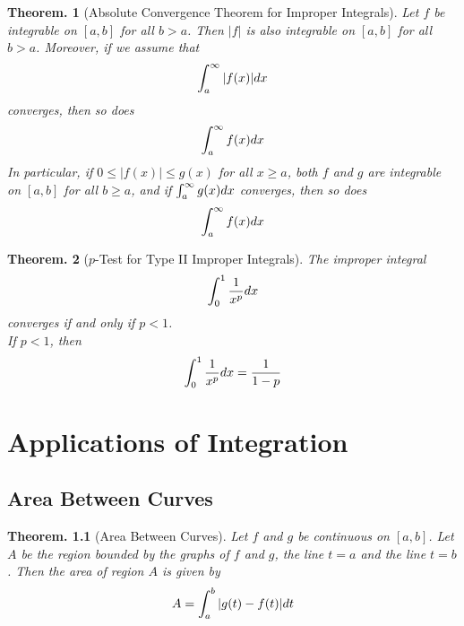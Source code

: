 \documentclass[11pt, a4paper]{memoir}
\theoremstyle{change}
\newtheorem{theorem}{Theorem.}[section]
\theoremstyle{plain}
\theoremstyle{nonumberplain}
\numberwithin{equation}{section}
\begin{document}
\begin{theorem}[Absolute Convergence Theorem for Improper Integrals]
    Let $f$ be integrable on $[a,b]$ for all $b > a$. Then $|f|$ is also integrable on $[a,b]$ for all $b > a$. Moreover, if we assume that $$\int^\infty_a |f(x)|\space dx$$ converges, then so does $$\int^\infty_a f(x) \space dx$$ In particular, if $0 \le |f(x)| \le g(x)$ for all $x \ge a$, both $f$ and $g$ are integrable on $[a,b]$ for all $b \ge a$, and if  $\int^\infty_a g(x) \space dx$ converges, then so does $$\int^\infty_a f(x) \space dx$$
\end{theorem}
\begin{theorem}[$p$-Test for Type II Improper Integrals]
    The improper integral $$\int^1_0 \dfrac{1}{x^p} \space dx$$ converges if and only if $p < 1$. \\If $p < 1$, then $$\int^1_0 \dfrac{1}{x^p} \space dx = \dfrac{1}{1 - p}$$
\end{theorem}

\chapter{Applications of Integration}
\section{Area Between Curves}
\begin{theorem}[Area Between Curves]
    Let $f$ and $g$ be continuous on $[a,b]$. Let $A$ be the region bounded by the graphs of $f$ and $g$, the line $t = a$ and the line $t = b$. Then the area of region $A$ is given by $$A = \int^b_a |g(t) - f(t)|\space dt$$
\end{theorem}
\end{document}
